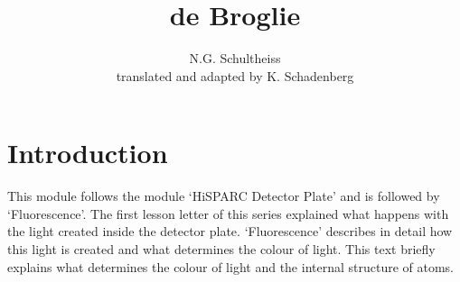 



\author{N.G. Schultheiss \\ translated and adapted by K. Schadenberg}
\date{}
\title{de Broglie}



\maketitle

\section{Introduction}
This module follows the module `HiSPARC Detector Plate' and is followed by `Fluorescence'. The first lesson letter of this series explained what happens with the light created inside the detector plate. `Fluorescence' describes in detail how this light is created and what determines the colour of light. This text briefly explains what determines the colour of light and the internal structure of atoms. 

